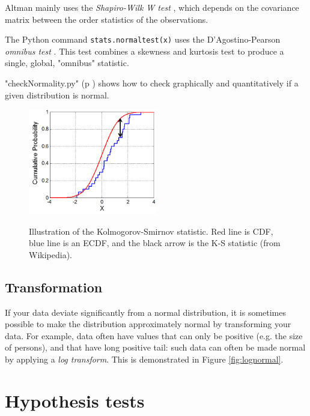 Altman mainly uses the \emph{Shapiro-Wilk W test} \cite{altman99}, which depends on the covariance matrix between the order statistics of the observations.

The Python command \lstinline{stats.normaltest(x)} uses the D’Agostino-Pearson \emph{omnibus test} . This test combines a skewness and kurtosis test to produce a single, global, "omnibus" statistic.

\PyImg "checkNormality.py" (p \pageref{py:checkNormality}) shows how to check graphically and quantitatively if a given distribution is normal.

\begin{figure}
  \centering
  \includegraphics[width=0.5\textwidth]{../Images/KS_Example.png}\\
  \caption{Illustration of the Kolmogorov-Smirnov statistic. Red line is CDF, blue line is an ECDF, and the black arrow is the K-S statistic (from Wikipedia).}\label{fig:ksplot}
\end{figure}


\subsection{Transformation} 
If your data deviate significantly from a normal distribution, it is sometimes possible to make the distribution approximately normal by transforming your data. For example, data often have values that can only be positive (e.g. the size of persons), and that have  long positive tail: such data can often be made normal by applying a \emph{log transform}. This is demonstrated in Figure \ref{fig:lognormal}.


\section{Hypothesis tests}\label{sec:hypotheses} 


